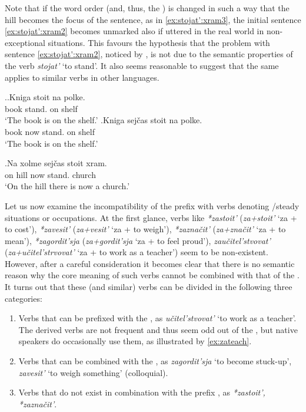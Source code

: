Note that if the word order (and, thus, the ) is changed in such a way that the hill becomes the focus of the sentence, as in \ref{ex:stojat':xram3}, the initial sentence \ref{ex:stojat':xram2} becomes unmarked also if uttered in the real world in non-exceptional situations. This favours the hypothesis that the problem with  sentence \ref{ex:stojat':xram2}, noticed by \citet{Paducheva:96}, is not due to the semantic properties of the verb \textit{stojat'} `to stand'. It also seems reasonable to suggest that the same applies to similar verbs in other languages. 

\ex.\label{ex:stojat':kniga}\ag.Kniga stoit na polke.\\
book stand. on shelf\\
\trans `The book is on the shelf.'
\bg.Kniga sej\v{c}as stoit na polke.\\
book now stand. on shelf\\
\trans `The book is on the shelf.'

\exg.\label{ex:stojat':xram3}Na xolme sej\v{c}as stoit xram.\\
on hill now stand. church\\
\trans `On the hill there is now a church.'

Let us now examine the incompatibility of the  prefix  with verbs denoting /steady situations or occupations. At the first glance, verbs like \textit{*zastoit'} (\textit{za+stoit'} `za + to cost'), \textit{*zavesit'} (\textit{za+vesit'} `za + to weigh'), \textit{*zazna\v{c}it'} (\textit{za+zna\v{c}it'} `za + to mean'), \textit{*zagordit'sja} (\textit{za+gordit'sja} `za + to feel proud'), \textit{zau\v{c}itel'stvovat'} (\textit{za+u\v{c}itel'strvovat'} `za + to work as a teacher') seem to be non-existent. However, after a careful consideration it becomes clear that there is no semantic reason why the core meaning of such verbs cannot be combined with that of the  . It turns out that these (and similar) verbs can be divided in the following three categories:

\begin{enumerate}
\item Verbs that can be prefixed with the  , as \textit{u\v{c}itel'stvovat'} `to work as a teacher'. The derived  verbs are not frequent and thus seem odd out of the , but native speakers do occasionally use them, as illustrated by \ref{ex:zateach}.
\item Verbs that can be combined with the  , as \textit{zagordit'sja} `to become stuck-up', \textit{zavesit'} `to weigh something' (colloquial).
\item Verbs that do not exist in combination with the prefix , as \textit{*zastoit', *zazna\v{c}it'}.
\end{enumerate}

